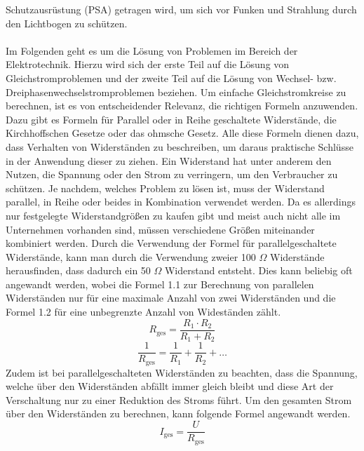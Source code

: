 Schutzausrüstung (PSA) getragen wird, um sich vor Funken und Strahlung durch den Lichtbogen zu schützen. \\\\ %
Im Folgenden geht es um die Lösung von Problemen im Bereich der Elektrotechnik. Hierzu wird sich der erste Teil auf die Lösung von Gleichstromproblemen und der 
zweite Teil auf die Lösung von Wechsel- bzw. Dreiphasenwechselstromproblemen beziehen. Um einfache Gleichstromkreise zu berechnen, ist es von entscheidender Relevanz, 
die richtigen Formeln anzuwenden. Dazu gibt es \zB Formeln für Parallel oder in Reihe geschaltete Widerstände, die Kirchhoffschen Gesetze oder das ohmsche 
Gesetz. Alle diese Formeln dienen dazu, dass Verhalten von Widerständen zu beschreiben, um daraus praktische Schlüsse in der Anwendung dieser zu ziehen. 
Ein Widerstand hat unter anderem den Nutzen, die Spannung oder den Strom zu verringern, um den Verbraucher zu schützen. Je nachdem, welches Problem zu 
lösen ist, muss der Widerstand parallel, in Reihe oder beides in Kombination verwendet werden. Da es allerdings nur festgelegte Widerstandgrößen zu kaufen 
gibt und meist auch nicht alle im Unternehmen vorhanden sind, müssen verschiedene Größen miteinander kombiniert werden. Durch die Verwendung der Formel für 
parallelgeschaltete Widerstände, kann man \zB durch die Verwendung zweier 100 $\Omega$ Widerstände herausfinden, dass dadurch ein 50 $\Omega$ Widerstand 
entsteht. 
Dies kann beliebig oft angewandt werden, wobei die Formel 1.1 zur Berechnung von parallelen Widerständen nur für eine maximale Anzahl von zwei 
Widerständen und die Formel 1.2 für eine unbegrenzte Anzahl von Wideständen zählt.
\begin{equation}
R_{\text{ges}}=\frac{R_1 \cdot R_2}{R_1+R_2}
\label{eqn:Parallelschaltung von 2 Widerständen}
\end{equation}
\begin{equation}
\frac{1}{R_{\text{ges}}}=\frac{1}{R_1}+\frac{1}{R_2}+\dots
\label{eqn:Parallelschaltung von mehreren Widerständen}
\end{equation}
Zudem ist bei parallelgeschalteten Widerständen zu beachten, dass die Spannung, welche über den Widerständen abfällt immer gleich bleibt und diese Art der 
Verschaltung nur zu einer Reduktion des Stroms führt. Um den gesamten Strom über den Widerständen zu berechnen, kann folgende Formel angewandt werden.
\begin{equation}
I_{\text{ges}} = \frac{U}{R_{\text{ges}}}
\label{eqn:Gesamtstrom Parallelschaltung}
\end{equation}
